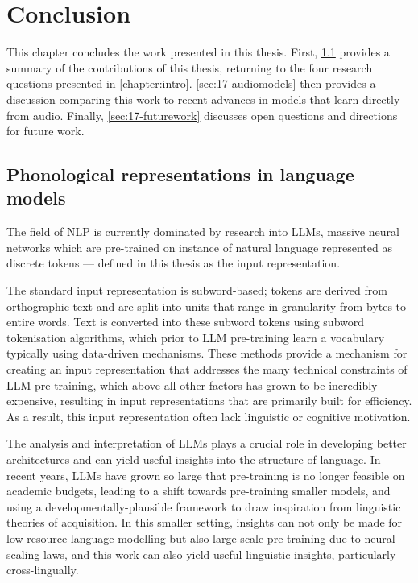 \chapter{Conclusion}\label{chapter:conclusion}

This chapter concludes the work presented in this thesis. First, \cref{sec:17-summary} provides a summary of the contributions of this thesis, returning to the four research questions presented in \cref{chapter:intro}. \cref{sec:17-audiomodels} then provides a discussion comparing this work to recent advances in models that learn directly from audio. Finally, \cref{sec:17-futurework} discusses open questions and directions for future work.

\section{Phonological representations in language models}
\label{sec:17-summary}

The field of NLP is currently dominated by research into LLMs, massive neural networks which are pre-trained on instance of natural language represented as discrete tokens --- defined in this thesis as the input representation.

The standard input representation is subword-based; tokens are derived from orthographic text and are split into units that range in granularity from bytes to entire words. Text is converted into these subword tokens using subword tokenisation algorithms, which prior to LLM pre-training learn a vocabulary typically using data-driven mechanisms. These methods provide a mechanism for creating an input representation that addresses the many technical constraints of LLM pre-training, which above all other factors has grown to be incredibly expensive, resulting in input representations that are primarily built for efficiency. As a result, this input representation often lack linguistic or cognitive motivation.

The analysis and interpretation of LLMs plays a crucial role in developing better architectures and can yield useful insights into the structure of language. In recent years, LLMs have grown so large that pre-training is no longer feasible on academic budgets, leading to a shift towards pre-training smaller models, and using a developmentally-plausible framework to draw inspiration from linguistic theories of acquisition. In this smaller setting, insights can not only be made for low-resource language modelling but also large-scale pre-training due to neural scaling laws, and this work can also yield useful linguistic insights, particularly cross-lingually.

